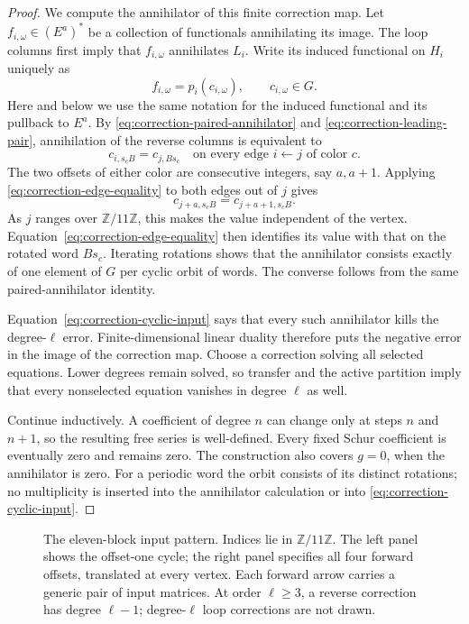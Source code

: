 \begin{proof}
We compute the annihilator of this finite correction map.  Let
$f_{i,\omega}\in(E^a)^*$ be a collection of functionals annihilating its
image.  The loop columns first imply that $f_{i,\omega}$ annihilates
$L_i$.  Write its induced functional on $H_i$ uniquely as
\[
 f_{i,\omega}=p_i(c_{i,\omega}),\qquad c_{i,\omega}\in G.
\]
Here and below we use the same notation for the induced functional and
its pullback to $E^a$.  By
\eqref{eq:correction-paired-annihilator} and
\eqref{eq:correction-leading-pair}, annihilation of the reverse columns
is equivalent to
\begin{equation}
 c_{i,s_cB}=c_{j,Bs_c}
 \quad\text{on every edge }i\leftarrow j\text{ of color }c.
 \label{eq:correction-edge-equality}
\end{equation}
The two offsets of either color are consecutive integers, say $a,a+1$.
Applying \eqref{eq:correction-edge-equality} to both edges out of $j$
gives
\[
 c_{j+a,s_cB}=c_{j+a+1,s_cB}.
\]
As $j$ ranges over $\mathbb Z/11\mathbb Z$, this makes the value
independent of the vertex.  Equation~\eqref{eq:correction-edge-equality}
then identifies its value with that on the rotated word $Bs_c$.
Iterating rotations shows that the annihilator consists exactly of one
element of $G$ per cyclic orbit of words.  The converse follows from
the same paired-annihilator identity.

Equation~\eqref{eq:correction-cyclic-input} says that every such
annihilator kills the degree-$\ell$ error.  Finite-dimensional linear
duality therefore puts the negative error in the image of the correction
map.  Choose a correction solving all selected equations.  Lower degrees
remain solved, so transfer and the active partition imply that every
nonselected equation vanishes in degree $\ell$ as well.

Continue inductively.  A coefficient of degree $n$ can change only at
steps $n$ and $n+1$, so the resulting free series is well-defined.
Every fixed Schur coefficient is eventually zero and remains zero.
The construction also covers $g=0$, when the annihilator is zero.
For a periodic word the orbit consists of its distinct rotations; no
multiplicity is inserted into the annihilator calculation or into
\eqref{eq:correction-cyclic-input}.
\end{proof}

\begin{figure}[tbp]
\centering

\caption{The eleven-block input pattern. Indices lie in $\mathbb Z/11\mathbb Z$.
The left panel shows the offset-one cycle; the right panel specifies all
four forward offsets, translated at every vertex. Each forward arrow carries a
generic pair of input matrices. At order $\ell\ge3$, a reverse correction
has degree $\ell-1$; degree-$\ell$ loop corrections are not drawn.}
\label{fig:eleven-blocks}
\end{figure}

